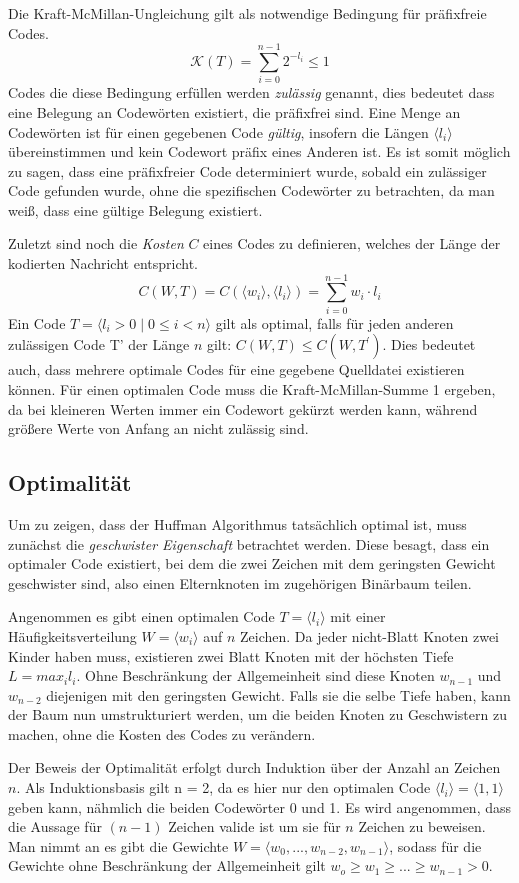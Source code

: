 \documentclass[course=erap]{aspdoc}
\begin{document}
Die Kraft-McMillan-Ungleichung gilt als notwendige Bedingung für präfixfreie Codes.
$$\mathcal{K}(T) = \sum_{i=0}^{n-1} 2^{-l_i} \le 1$$
Codes die diese Bedingung erfüllen werden \textit{zulässig} genannt, dies bedeutet dass eine Belegung an Codewörten existiert, die präfixfrei sind.
Eine Menge an Codewörten ist für einen gegebenen Code \textit{gültig}, insofern die Längen $\langle l_i \rangle$ übereinstimmen und kein Codewort präfix eines Anderen ist.
Es ist somit möglich zu sagen, dass eine präfixfreier Code determiniert wurde, sobald ein zulässiger Code gefunden wurde, ohne die spezifischen Codewörter zu betrachten, da man weiß, dass eine gültige Belegung existiert.

Zuletzt sind noch die \textit{Kosten} $C$ eines Codes zu definieren, welches der Länge der kodierten Nachricht entspricht.
$$C(W,T) = C(\langle w_i \rangle,\langle l_i \rangle) = \sum_{i=0}^{n-1} w_i \cdot l_i $$
Ein Code $T = \langle l_i > 0 \mid 0 \le i < n \rangle$ gilt als optimal, falls für jeden anderen zulässigen Code T' der Länge $n$ gilt: $C(W,T) \le C(W,T^{\prime})$. Dies bedeutet auch, dass mehrere optimale Codes für eine gegebene Quelldatei existieren können.
Für einen optimalen Code muss die Kraft-McMillan-Summe 1 ergeben, da bei kleineren Werten immer ein Codewort gekürzt werden kann, während größere Werte von Anfang an nicht zulässig sind.

\subsection{Optimalität}

Um zu zeigen, dass der Huffman Algorithmus tatsächlich optimal ist, muss zunächst die \textit{geschwister Eigenschaft} betrachtet werden.
Diese besagt, dass ein optimaler Code existiert, bei dem die zwei Zeichen mit dem geringsten Gewicht geschwister sind, also einen Elternknoten im zugehörigen Binärbaum teilen.

Angenommen es gibt einen optimalen Code $T = \langle l_i \rangle $ mit einer Häufigkeitsverteilung $W = \langle w_i \rangle $ auf $n$ Zeichen.
Da jeder nicht-Blatt Knoten zwei Kinder haben muss, existieren zwei Blatt Knoten mit der höchsten Tiefe $ L = max_i l_i$. Ohne Beschränkung der Allgemeinheit sind diese Knoten $w_{n-1}$ und $w_{n-2}$ diejenigen mit den geringsten Gewicht. Falls sie die selbe Tiefe haben, kann der Baum nun umstrukturiert werden, um die beiden Knoten zu Geschwistern zu machen, ohne die Kosten des Codes zu verändern.

Der Beweis der Optimalität erfolgt durch Induktion über der Anzahl an Zeichen $n$. \cite{HufProof}
Als Induktionsbasis gilt n = 2, da es hier nur den optimalen Code $ \langle l_i \rangle = \langle 1, 1 \rangle $ geben kann, nähmlich die beiden Codewörter 0 und 1.
Es wird angenommen, dass die Aussage für $(n-1)$ Zeichen valide ist um sie für $n$ Zeichen zu beweisen.
Man nimmt an es gibt die Gewichte $W = \langle w_0,..., w_{n-2}, w_{n-1} \rangle $, sodass für die Gewichte ohne Beschränkung der Allgemeinheit gilt $w_o \ge w_1 \ge ... \ge w_{n-1} > 0$.
\end{document}
